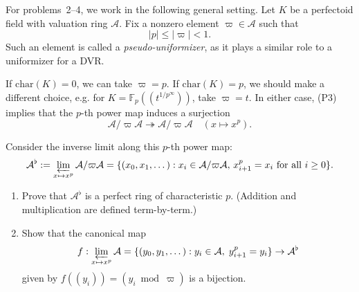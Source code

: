 \documentclass[12pt]{article}  %
\begin{document}
For problems~2--4, we work in the following general setting.  
Let $K$ be a perfectoid field with valuation ring $\mathcal{A}$.  
Fix a nonzero element $\varpi \in \mathcal{A}$ such that
\[
|p| \le |\varpi| < 1.
\]
Such an element is called a \emph{pseudo-uniformizer}, as it plays a similar role to a uniformizer for a DVR.

If $\mathrm{char}(K)=0$, we can take $\varpi = p$.  
If $\mathrm{char}(K)=p$, we should make a different choice, e.g. for $K = \mathbb{F}_p((t^{1/p^\infty}))$, take $\varpi = t$.  
In either case, (P3) implies that the $p$-th power map induces a surjection
\[
\mathcal{A}/\varpi \mathcal{A} \twoheadrightarrow \mathcal{A}/\varpi \mathcal{A} \quad (x \mapsto x^p).
\]

\medskip

Consider the inverse limit along this $p$-th power map:
\[
\mathcal{A}^\flat := \varprojlim_{x \mapsto x^p} \mathcal{A}/\varpi \mathcal{A}
= \{ (x_0, x_1, \dots) : x_i \in \mathcal{A}/\varpi \mathcal{A},\, x_{i+1}^p = x_i \text{ for all } i \ge 0 \}.
\]

\begin{problem}[2]
\leavevmode
\begin{enumerate}[label=(\arabic*)]
\item Prove that $\mathcal{A}^\flat$ is a perfect ring of characteristic $p$.  
(Addition and multiplication are defined term-by-term.)
\item Show that the canonical map
\[
f : \varprojlim_{x \mapsto x^p} \mathcal{A} = \{ (y_0, y_1, \dots) : y_i \in \mathcal{A},\; y_{i+1}^p = y_i \} \to \mathcal{A}^\flat
\]
given by $f((y_i)) = (y_i \bmod \varpi)$ is a bijection.
\end{enumerate}
\end{problem}
\end{document}
